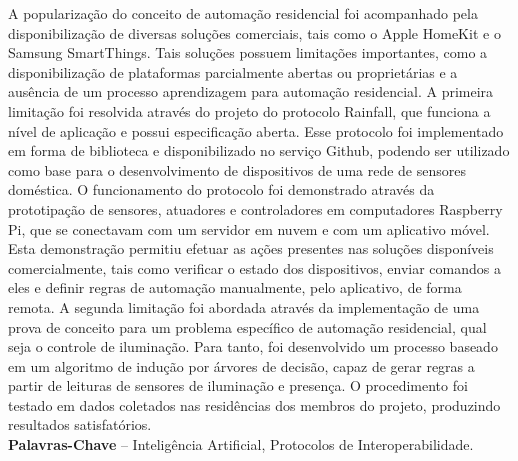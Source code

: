 \documentclass[]{politex}
\begin{document}
\begin{resumo}
A popularização do conceito de automação residencial foi acompanhado pela disponibilização de diversas soluções comerciais, tais como o Apple HomeKit e o Samsung SmartThings. Tais soluções possuem limitações importantes, como a disponibilização de plataformas parcialmente abertas ou proprietárias e a ausência de um processo aprendizagem para automação residencial. A primeira limitação foi resolvida através do projeto do protocolo Rainfall, que funciona a nível de aplicação e possui especificação aberta. Esse protocolo foi implementado em forma de biblioteca e disponibilizado no serviço Github, podendo ser utilizado como base para o desenvolvimento de dispositivos de uma rede de sensores doméstica. O funcionamento do protocolo foi demonstrado através da prototipação de sensores, atuadores e controladores em computadores Raspberry Pi, que se conectavam com um servidor em nuvem e com um aplicativo móvel. Esta demonstração permitiu efetuar as ações presentes nas soluções disponíveis comercialmente, tais como verificar o estado dos dispositivos, enviar comandos a eles e definir regras de automação manualmente, pelo aplicativo, de forma remota. A segunda limitação foi abordada através da implementação de uma prova de conceito para um problema específico de automação residencial, qual seja o controle de iluminação. Para tanto, foi desenvolvido um processo baseado em um algoritmo de indução por árvores de decisão, capaz de gerar regras a partir de leituras de sensores de iluminação e presença. O procedimento foi testado em dados coletados nas residências dos membros do projeto, produzindo resultados satisfatórios.
%
\\[3\baselineskip]
%
\textbf{Palavras-Chave} -- Inteligência Artificial, Protocolos de Interoperabilidade.
\end{resumo}
\end{document}
